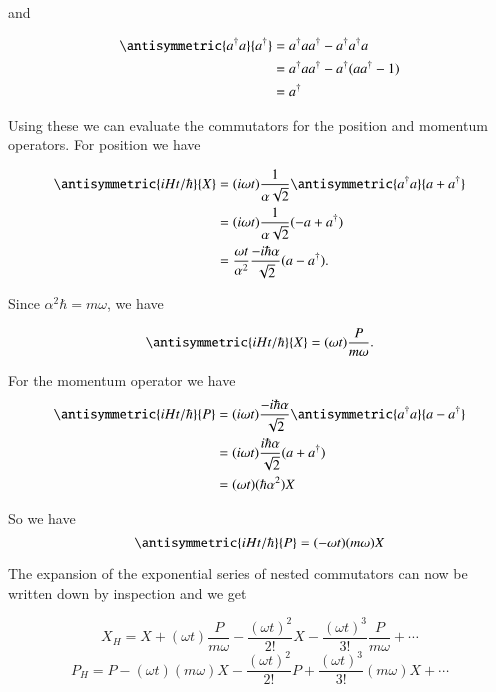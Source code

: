 and

\begin{align*}
\antisymmetric{a^\dagger a}{a^\dagger}
&=
a^\dagger a a^\dagger - a^\dagger a^\dagger a \\ 
&=
a^\dagger a a^\dagger - a^\dagger (a a^\dagger -1) \\ 
&=
a^\dagger
\end{align*}

Using these we can evaluate the commutators for the position and momentum operators.  For position we have

\begin{align*}
\antisymmetric{i H t /\hbar }{X} 
&= (i \omega t) \inv{\alpha \sqrt{2}} \antisymmetric{a^\dagger a}{a+ a^\dagger} \\
&= (i \omega t) \inv{\alpha \sqrt{2}} (-a + a^\dagger ) \\
&= \frac{\omega t}{\alpha^2} \frac{-i \hbar \alpha}{ \sqrt{2}} (a - a^\dagger ).
\end{align*}

Since $\alpha^2 \hbar = m \omega$, we have

\begin{equation}\label{eqn:desaiCh9:106}
\antisymmetric{i H t /\hbar }{X} = (\omega t) \frac{P}{m \omega }.
\end{equation}

For the momentum operator we have
\begin{align*}
\antisymmetric{i H t /\hbar }{P} 
&= (i \omega t) \frac{-i \hbar \alpha}{ \sqrt{2}} \antisymmetric{a^\dagger a}{a- a^\dagger} \\
&= (i \omega t) \frac{i \hbar \alpha}{ \sqrt{2}} (a + a^\dagger) \\
&= (\omega t) (\hbar \alpha^2) X
\end{align*}

So we have
\begin{equation}\label{eqn:desaiCh9:107}
\antisymmetric{i H t /\hbar }{P} = (-\omega t) (m \omega ) X
\end{equation}

The expansion of the exponential series of nested commutators can now be written down by inspection and we get

\begin{equation}\label{eqn:desaiCh9:108}
X_H = X + (\omega t) \frac{P}{m \omega} - \frac{(\omega t)^2}{2!} X - \frac{(\omega t)^3}{3!} \frac{P}{m \omega} + \cdots
\end{equation}
\begin{equation}\label{eqn:desaiCh9:109}
P_H = P - (\omega t) (m \omega)X - \frac{(\omega t)^2}{2!} P + \frac{(\omega t)^3}{3!} (m \omega)X + \cdots
\end{equation}

